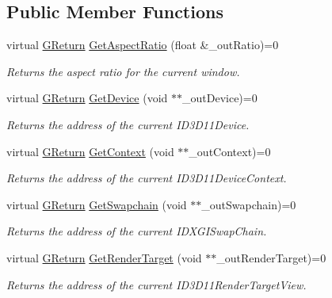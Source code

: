 \subsection*{Public Member Functions}
\begin{DoxyCompactItemize}
\item 
virtual \hyperlink{namespaceGW_a67a839e3df7ea8a5c5686613a7a3de21}{G\+Return} \hyperlink{classGW_1_1GRAPHICS_1_1GDirectX11Surface_a4ae8372993803025a14a8471835ed231}{Get\+Aspect\+Ratio} (float \&\+\_\+out\+Ratio)=0
\begin{DoxyCompactList}\small\item\em Returns the aspect ratio for the current window. \end{DoxyCompactList}\item 
virtual \hyperlink{namespaceGW_a67a839e3df7ea8a5c5686613a7a3de21}{G\+Return} \hyperlink{classGW_1_1GRAPHICS_1_1GDirectX11Surface_a076c4f3a07f79f578185416be449ebd2}{Get\+Device} (void $\ast$$\ast$\+\_\+out\+Device)=0
\begin{DoxyCompactList}\small\item\em Returns the address of the current I\+D3\+D11\+Device. \end{DoxyCompactList}\item 
virtual \hyperlink{namespaceGW_a67a839e3df7ea8a5c5686613a7a3de21}{G\+Return} \hyperlink{classGW_1_1GRAPHICS_1_1GDirectX11Surface_aceaa2e22cbdee6c651cf2045d9320041}{Get\+Context} (void $\ast$$\ast$\+\_\+out\+Context)=0
\begin{DoxyCompactList}\small\item\em Returns the address of the current I\+D3\+D11\+Device\+Context. \end{DoxyCompactList}\item 
virtual \hyperlink{namespaceGW_a67a839e3df7ea8a5c5686613a7a3de21}{G\+Return} \hyperlink{classGW_1_1GRAPHICS_1_1GDirectX11Surface_a8388438c79a82a10f595e10b0bbaab2c}{Get\+Swapchain} (void $\ast$$\ast$\+\_\+out\+Swapchain)=0
\begin{DoxyCompactList}\small\item\em Returns the address of the current I\+D\+X\+G\+I\+Swap\+Chain. \end{DoxyCompactList}\item 
virtual \hyperlink{namespaceGW_a67a839e3df7ea8a5c5686613a7a3de21}{G\+Return} \hyperlink{classGW_1_1GRAPHICS_1_1GDirectX11Surface_a953f4809860408b0e99928ac8b9b6a53}{Get\+Render\+Target} (void $\ast$$\ast$\+\_\+out\+Render\+Target)=0
\begin{DoxyCompactList}\small\item\em Returns the address of the current I\+D3\+D11\+Render\+Target\+View. \end{DoxyCompactList}\item 

\end{DoxyCompactItemize}
